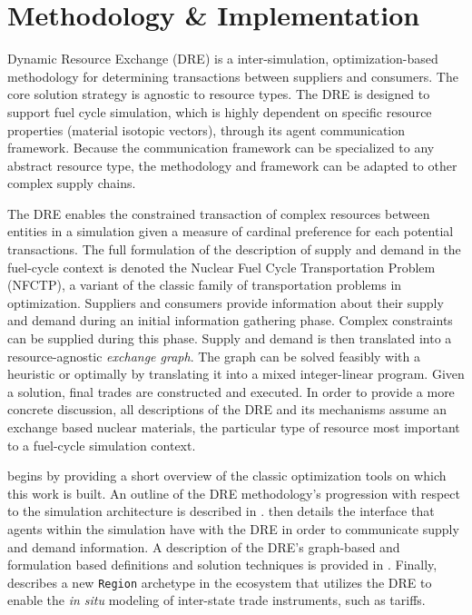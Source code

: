 



\section{Methodology \& Implementation}\label{sec:methods}

Dynamic Resource Exchange (DRE) is a inter-simulation, optimization-based
methodology for determining transactions between suppliers and consumers. The
core solution strategy is agnostic to resource types. The DRE is designed to
support fuel cycle simulation, which is highly dependent on specific resource
properties (material isotopic vectors), through its agent communication
framework. Because the communication framework can be specialized to any
abstract resource type, the methodology and framework can be adapted to other
complex supply chains.

The DRE enables the constrained transaction of complex resources between
entities in a simulation given a measure of cardinal preference for each
potential transactions. The full formulation of the description of supply and
demand in the fuel-cycle context is denoted the Nuclear Fuel Cycle
Transportation Problem (NFCTP), a variant of the classic family of
transportation problems in optimization. Suppliers and consumers provide
information about their supply and demand during an initial information
gathering phase. Complex constraints can be supplied during this phase. Supply
and demand is then translated into a resource-agnostic \textit{exchange
  graph}. The graph can be solved feasibly with a heuristic or optimally by
translating it into a mixed integer-linear program. Given a solution, final
trades are constructed and executed. In order to provide a more concrete
discussion, all descriptions of the DRE and its mechanisms assume an
exchange based nuclear materials, the particular type of resource most important 
to a fuel-cycle simulation context.

 begins by providing a short overview of the
classic optimization tools on which this work is built. An outline of the DRE
methodology's progression with respect to the simulation architecture is
described in .  then details the
interface that agents within the simulation have with the DRE in order to
communicate supply and demand information. A description of the DRE's
graph-based and formulation based definitions and solution techniques is
provided in . Finally,  describes a new
\texttt{Region} archetype in the \Cyclus ecosystem that utilizes the DRE to
enable the \textit{in situ} modeling of inter-state trade instruments, such as
tariffs.

